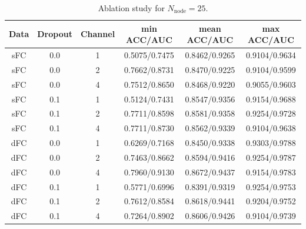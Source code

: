 \documentclass[11pt]{article}
\begin{document}
\begin{table}[H]
    \centering
    \begin{tabular}{|c|c|c|c|c|c|}
        \hline
        Data & Dropout & Channel & min ACC/AUC   & mean ACC/AUC  & max ACC/AUC   \\
        \hline
        sFC  & 0.0     & 1       & 0.5075/0.7475 & 0.8462/0.9265 & 0.9104/0.9634 \\
        \hline
        sFC  & 0.0     & 2       & 0.7662/0.8731 & 0.8470/0.9225 & 0.9104/0.9599 \\
        \hline
        sFC  & 0.0     & 4       & 0.7512/0.8650 & 0.8468/0.9220 & 0.9055/0.9603 \\
        \hline
        sFC  & 0.1     & 1       & 0.5124/0.7431 & 0.8547/0.9356 & 0.9154/0.9688 \\
        \hline
        sFC  & 0.1     & 2       & 0.7711/0.8598 & 0.8581/0.9358 & 0.9254/0.9728 \\
        \hline
        sFC  & 0.1     & 4       & 0.7711/0.8730 & 0.8562/0.9339 & 0.9104/0.9638 \\
        \hline
        dFC  & 0.0     & 1       & 0.6269/0.7168 & 0.8450/0.9338 & 0.9303/0.9788 \\
        \hline
        dFC  & 0.0     & 2       & 0.7463/0.8662 & 0.8594/0.9416 & 0.9254/0.9787 \\
        \hline
        dFC  & 0.0     & 4       & 0.7960/0.9130 & 0.8672/0.9437 & 0.9154/0.9783 \\
        \hline
        dFC  & 0.1     & 1       & 0.5771/0.6996 & 0.8391/0.9319 & 0.9254/0.9753 \\
        \hline
        dFC  & 0.1     & 2       & 0.7612/0.8584 & 0.8618/0.9441 & 0.9204/0.9752 \\
        \hline
        dFC  & 0.1     & 4       & 0.7264/0.8902 & 0.8606/0.9426 & 0.9104/0.9739 \\
        \hline
    \end{tabular}
    \caption{Ablation study for $N_{\text{node}} = 25$.}
\end{table}
\end{document}
